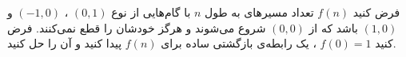     \p 
فرض کنید
$f(n)$
تعداد مسیرهای به طول
$n$
با گام‌هایی از نوع
$(0, 1)$
،
$(-1, 0)$
و
$(1, 0)$
باشد که از
$(0, 0)$
شروع می‌شوند و هرگز خودشان را قطع نمی‌کنند. فرض کنید
$f(0) = 1$
، یک رابطه‌ی بازگشتی ساده برای
$f(n)$
پیدا کنید و آن را حل کنید.